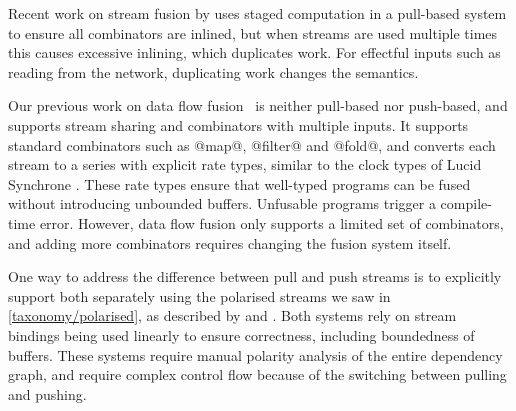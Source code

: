 Recent work on stream fusion by \citet{kiselyov2016stream} uses staged computation in a pull-based system to ensure all combinators are inlined, but when streams are used multiple times this causes excessive inlining, which duplicates work.
For effectful inputs such as reading from the network, duplicating work changes the semantics.

Our previous work on data flow fusion~\cite{lippmeier2013data} is neither pull-based nor push-based, and supports stream sharing and combinators with multiple inputs.
It supports standard combinators such as @map@, @filter@ and @fold@, and converts each stream to a series with explicit rate types, similar to the clock types of Lucid Synchrone \cite{benveniste2003synchronous}.
These rate types ensure that well-typed programs can be fused without introducing unbounded buffers.
Unfusable programs trigger a compile-time error.
However, data flow fusion only supports a limited set of combinators, and adding more combinators requires changing the fusion system itself.

One way to address the difference between pull and push streams is to explicitly support both separately using the polarised streams we saw in \cref{taxonomy/polarised}, as described by \citet{bernardy2015duality} and \citet{lippmeier2016polarized}.
Both systems rely on stream bindings being used linearly to ensure correctness, including boundedness of buffers.
These systems require manual polarity analysis of the entire dependency graph, and require complex control flow because of the switching between pulling and pushing.


